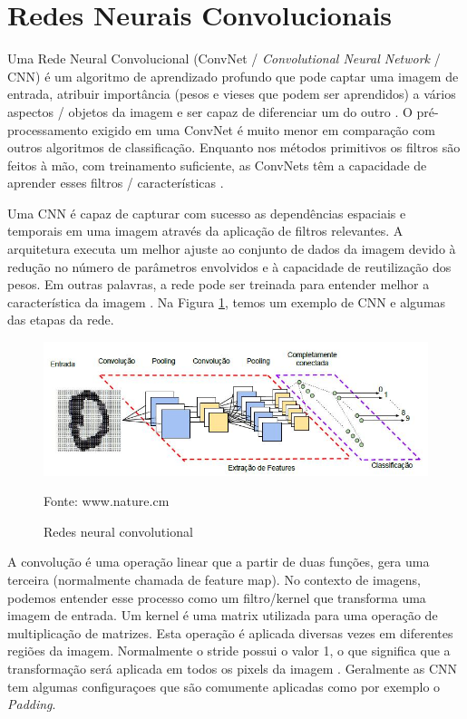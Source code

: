 \documentclass[openright]{UFRGS} %
\begin{document}
\section{Redes Neurais Convolucionais}

Uma Rede Neural Convolucional (ConvNet / \textit{Convolutional Neural Network} / CNN) é um algoritmo de aprendizado profundo que pode captar uma imagem de entrada, atribuir importância (pesos e vieses que podem ser aprendidos) a vários aspectos / objetos da imagem e ser capaz de diferenciar um do outro  \cite{vargas2016estudo}. O pré-processamento exigido em uma ConvNet é muito menor em comparação com outros algoritmos de classificação. Enquanto nos métodos primitivos os filtros são feitos à mão, com treinamento suficiente, as ConvNets têm a capacidade de aprender esses filtros / características \cite{vargas2016estudo}.

Uma CNN é capaz de capturar com sucesso as dependências espaciais e temporais em uma imagem através da aplicação de filtros relevantes. A arquitetura executa um melhor ajuste ao conjunto de dados da imagem devido à redução no número de parâmetros envolvidos e à capacidade de reutilização dos pesos. Em outras palavras, a rede pode ser treinada para entender melhor a característica da imagem \cite{shalev2014understanding}. Na Figura \ref{fig:cnnref}, temos um exemplo de CNN e algumas das etapas da rede.



\begin{figure}[h]
    \centering
    \caption{Redes neural convolutional}
    \includegraphics[scale=0.50]{cnn.jpg}
    \centerline{Fonte: www.nature.cm}
    \label{fig:cnnref}
\end{figure}

A convolução é uma operação linear que a partir de duas funções, gera uma terceira (normalmente chamada de feature map). No contexto de imagens, podemos entender esse processo como um filtro/kernel que transforma uma imagem de entrada.
Um kernel é uma matrix utilizada para uma operação de multiplicação de matrizes. Esta operação é aplicada diversas vezes em diferentes regiões da imagem. Normalmente o stride possui o valor 1, o que significa que a transformação será aplicada em todos os pixels da imagem \cite{shalev2014understanding}. Geralmente as CNN tem algumas configuraçoes que são comumente aplicadas como por exemplo o \textit{Padding}.
\end{document}
